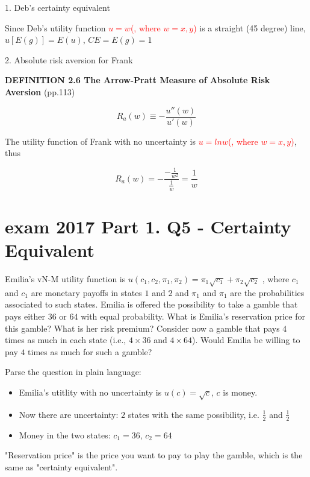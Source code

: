 \documentclass{article}
\begin{document}
1. Deb's certainty equivalent

Since Deb's utility function \textcolor{red}{$u = w$(, where $w = x,y$)} is a straight (45 degree) line, $u[E(g)] = E(u)$,
$CE =  E(g) = 1$

2. Absolute risk aversion for Frank

\begin{mdframed}[backgroundcolor=blue!20,linecolor=white]
\textbf{DEFINITION 2.6 The Arrow-Pratt Measure of Absolute Risk Aversion} (pp.113)

$$R_a(w) \equiv -\frac{u''(w)}{u'(w)}$$

\end{mdframed}


The utility function of Frank with no uncertainty is \textcolor{red}{$u = ln  w $(, where $w = x,y$)}, thus

$$R_a(w) = -\frac{-\frac{1}{w^2}}{\frac{1}{w}}=\frac{1}{w}$$

\newpage 

\section{exam 2017 Part 1. Q5 - Certainty Equivalent}

Emilia's vN-M utility function is $u(c_1,c_2,\pi_1, \pi_2) = \pi_1 \sqrt{c_1} + \pi_2 \sqrt{c_2}$
, where $c_1$ and $c_1$ are
monetary payoffs in states $1$ and $2$ and $\pi_1$ and $\pi_1$ are the probabilities associated to such states.
Emilia is offered the possibility to take a gamble that pays either $36$ or $64$ with equal probability.
What is Emilia’s reservation price for this gamble? What is her risk premium?
Consider now a gamble that pays $4$ times as much in each state (i.e., $4 \times 36$ and $4 \times 64$). Would
Emilia be willing to pay $4$ times as much for such a gamble? 


\begin{mdframed}[backgroundcolor=blue!20,linecolor=white]
Parse the question in plain language:

\begin{itemize}
\item Emilia's utitlity with no uncertainty is $u(c) = \sqrt{c}$, $c$ is money.
\item Now there are uncertainty: $2$ states with the same possibility, i.e. $\frac{1}{2}$ and $\frac{1}{2}$
\item Money in the two states: $c_1 = 36$, $c_2 = 64$

\end{itemize}

"Reservation price" is the price you want to pay to play the gamble, which is the same as "certainty equivalent".
\end{mdframed}
\end{document}
